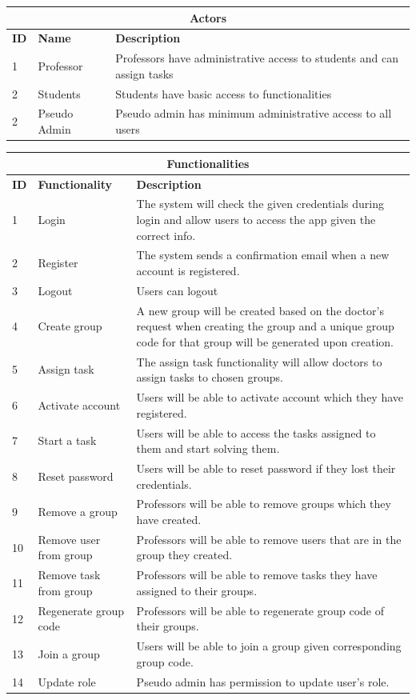 \documentclass[singlespacing,12pt,parskip,headsepline,consistentlayout]{article}
\begin{document}
\begin{center}    
\label{tbl:actors}
\begin{tabular}{ |p{1cm}|p{3cm}|p{9cm}|  }
\hline

\multicolumn{3}{|c|}{\bf{Actors}} \\
\hline
\bf{ID}& \bf{Name}&\bf{Description} \\
\hline
1&Professor&Professors have administrative access to students and can assign tasks\\
\hline
2&Students&Students have basic access to functionalities \\
2&Pseudo Admin&Pseudo admin has minimum administrative access to all users\\
\hline
\end{tabular}

\pagebreak
{}\label{tbl:functionalities}
\begin{tabular}{ |p{1cm}|p{3cm}|p{9cm}|  }
\hline

\multicolumn{3}{|c|}{\bf{Functionalities}} \\
\hline
\bf{ID}& \bf{Functionality}&\bf{Description} \\
\hline
1&Login&The system will check the given credentials during login and allow users to access the app given the correct info.\\
\hline
2&Register&The system sends a confirmation email when a new account is registered. \\
\hline
3&Logout&Users can logout\\
\hline
4&Create group&A new group will be created based on the doctor’s request when creating the group and a unique group code for that group will be generated upon creation.\\
\hline
5&Assign task&The assign task functionality will allow doctors to assign tasks to chosen groups.\\
\hline
6&Activate account&Users will be able to activate account which they have registered.\\
\hline
7&Start a task&Users will be able to access the tasks assigned to them and start solving them.\\
\hline
8&Reset password&Users will be able to reset password if they lost their credentials.\\
\hline
9&Remove a group&Professors will be able to remove groups which they have created.\\
\hline
10&Remove user from group&Professors will be able to remove users that are in the group they created.\\
\hline
11&Remove task from group&Professors will be able to remove tasks they have assigned to their groups.\\
\hline
12&Regenerate group code&Professors will be able to regenerate group code of their groups.\\
\hline
13&Join a group&Users will be able to join a group given corresponding group code.\\
14&Update role&Pseudo admin has permission to update user's role.\\
\hline
\end{tabular}


\end{center}
\end{document}
